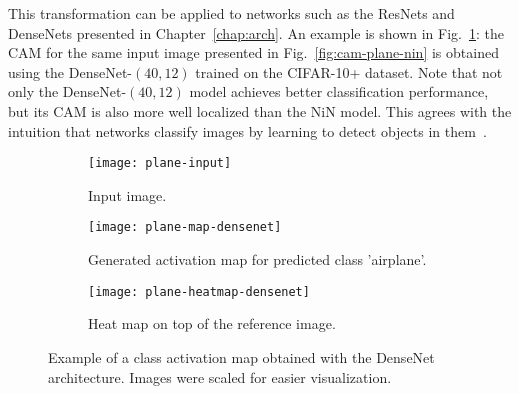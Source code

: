 This transformation can be applied to networks such as the ResNets and DenseNets presented in Chapter~\ref{chap:arch}. An example is shown in Fig.~\ref{fig:cam-plane-densenet}: the CAM for the same input image presented in Fig.~\ref{fig:cam-plane-nin} is obtained using the DenseNet-$(40, 12)$ trained on the CIFAR-10+ dataset. Note that not only the DenseNet-$(40, 12)$ model achieves better classification performance, but its CAM is also more well localized than the NiN model. This agrees with the intuition that networks classify images by learning to detect objects in them~\cite{zhou2015object}.

\begin{figure}
	\centering
	\begin{subfigure}[t]{0.3\textwidth}
		\texttt{[image: plane-input]}
		\caption{Input image.}
	\end{subfigure}\quad
	\begin{subfigure}[t]{0.3\textwidth}
		\texttt{[image: plane-map-densenet]}
		\caption{Generated activation map for predicted class 'airplane'.}
	\end{subfigure}\quad
	\begin{subfigure}[t]{0.3\textwidth}
		\texttt{[image: plane-heatmap-densenet]}
		\caption{Heat map on top of the reference image.}
	\end{subfigure}
	\caption{Example of a class activation map obtained with the DenseNet architecture. Images were scaled for easier visualization.\label{fig:cam-plane-densenet}}
\end{figure}

